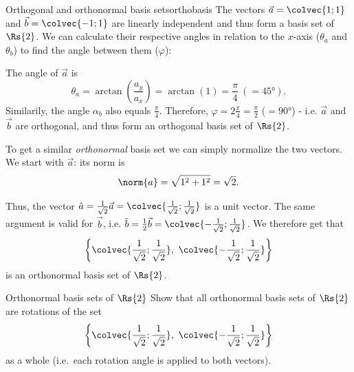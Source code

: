 \begin{example}{Orthogonal and orthonormal basis sets}{orthobasis}
	The vectors $\vec{a}=\colvec{1;1}$ and $\vec{b}=\colvec{-1;1}$ are linearly independent and thus form a basis set of $\Rs{2}$. We can calculate their respective angles in relation to the $x$-axis ($\theta_{a}$ and $\theta_{b}$) to find the angle between them ($\varphi$):

\begin{figure}[H]
	\centering
\end{figure}

The angle of $\vec{a}$ is
\[
	\theta_{a} = \arctan\left( \frac{a_{y}}{a_{x}} \right) = \arctan(1) = \frac{\pi}{4}\ (=\ang{45}).
\]
Similarily, the angle $\alpha_{b}$ also equals $\frac{\pi}{4}$. Therefore, $\varphi=2\frac{\pi}{4}=\frac{\pi}{2}$ ($=\ang{90}$) - i.e. $\vec{a}$ and $\vec{b}$ are orthogonal, and thus form an orthogonal basis set of $\Rs{2}$.

To get a similar \textit{orthonormal} basis set we can simply normalize the two vectors. We start with $\vec{a}$: its norm is
\[
	\norm{a} = \sqrt{1^{2}+1^{2}} = \sqrt{2}.
\]

Thus, the vector $\hat{a}=\frac{1}{\sqrt{2}}\vec{a}=\colvec{\frac{1}{\sqrt{2}};\frac{1}{\sqrt{2}}}$ is a unit vector. The same argument is valid for $\vec{b}$, i.e. $\hat{b}=\frac{1}{2}\vec{b}=\colvec{-\frac{1}{\sqrt{2}};\frac{1}{\sqrt{2}}}$. We therefore get that
\[
	\left\{ \colvec{\frac{1}{\sqrt{2}};\frac{1}{\sqrt{2}}},\ \colvec{-\frac{1}{\sqrt{2}};\frac{1}{\sqrt{2}}} \right\}
\]
is an orthonormal basis set of $\Rs{2}$.
\end{example}

\begin{challange}{Orthonormal basis sets of $\Rs{2}$}{}
Show that all orthonormal basis sets of $\Rs{2}$ are rotations of the set
\[
	\left\{ \colvec{\frac{1}{\sqrt{2}};\frac{1}{\sqrt{2}}},\ \colvec{-\frac{1}{\sqrt{2}};\frac{1}{\sqrt{2}}} \right\}
\]
as a whole (i.e.\ each rotation angle is applied to both vectors).
\end{challange}


